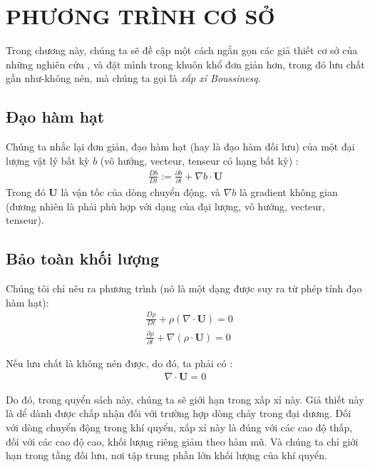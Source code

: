 \documentclass[DONG_HOC_KHI_QUYEN.tex]{subfiles}
\begin{document}
\chapter{PHƯƠNG TRÌNH CƠ SỞ}

Trong chương này, chúng ta sẽ đề cập một cách ngắn gọn các giả thiết cơ sở của những nghiên cứu , và đặt mình trong khuôn khổ đơn giản hơn, trong đó lưu chất gần như-không nén, mà chúng ta gọi là \textit{xấp xỉ Boussinesq}.

\section{Đạo hàm hạt}
Chúng ta nhắc lại đơn giản, đạo hàm hạt (hay là đạo hàm đối lưu) của một đại lượng vật lý bất kỳ $b$ (vô hướng, vecteur, tenseur có hạng bất kỳ) :
\begin{equation}
	\begin{aligned}
		\frac{Db}{Dt} := \frac{\partial b}{\partial t} + \nabla b \cdot \textbf{U}
	\end{aligned}
\end{equation}
Trong đó $\textbf{U}$ là vận tốc của dòng chuyển động, và $\nabla b$ là gradient không gian (đương nhiên là phải phù hợp với dạng của đại lượng, vô hướng, vecteur, tenseur).

\section{Bảo toàn khối lượng}
Chúng tôi chỉ nêu ra phương trình (nó là một dạng được suy ra từ phép tính đạo hàm hạt):
\begin{subequations}
	\begin{align}
		&\frac{D\rho}{Dt} + \rho(\nabla \cdot \textbf{U}) =0\\
		&\frac{\partial \rho}{\partial t} + \nabla (\rho \cdot \textbf{U}) =0
	\end{align}
\end{subequations}

Nếu lưu chất là không nén được, do đó, ta phải có :
\begin{equation}
	\begin{aligned}
		\nabla \cdot \textbf{U} = 0
	\end{aligned}
\end{equation}

Do đó, trong quyển sách này, chúng ta sẽ giới hạn trong xấp xỉ này. Giả thiết này là dể dành được chấp nhận đối với trường hợp dòng chảy trong đại dương. Đối với dòng chuyển động trong khí quyển, xấp xỉ này là đúng với các cao độ thấp, đối với các cao độ cao, khối lượng riêng giảm theo hàm mũ. Và chúng ta chỉ giới hạn trong tầng đối lưu, nơi tập trung phần lớn khối lượng của khí quyển.
\end{document}
